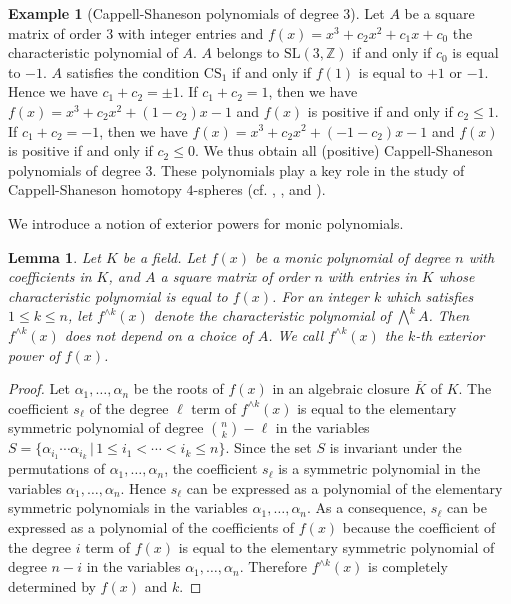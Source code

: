 \documentclass{amsart}
\theoremstyle{plain}
\newtheorem{lem}[thm]{Lemma}
\theoremstyle{definition}
\newtheorem{exmp}[thm]{Example}
\theoremstyle{remark}
\begin{document}
\begin{exmp}[Cappell-Shaneson polynomials of degree $3$]
Let $A$ be a square matrix of order $3$ with integer entries and 
$f(x)=x^3+c_2x^2+c_1x+c_0$ the characteristic polynomial of $A$. 
$A$ belongs to $\mathrm{SL}(3,\mathbb{Z})$ if and only if $c_0$ is equal to $-1$. 
$A$ satisfies the condition $\mathrm{CS}_1$ if and only if $f(1)$ is equal to $+1$ or $-1$. 
Hence we have $c_1+c_2=\pm 1$. 
If $c_1+c_2=1$, then we have $f(x)=x^3+c_2x^2+(1-c_2)x-1$ and $f(x)$ is positive if and only if 
$c_2\leq 1$. 
If $c_1+c_2=-1$, then we have $f(x)=x^3+c_2x^2+(-1-c_2)x-1$ and $f(x)$ is positive if and only if 
$c_2\leq 0$. 
We thus obtain all (positive) Cappell-Shaneson polynomials of degree $3$. 
These polynomials play a key role in the study of Cappell-Shaneson homotopy $4$-spheres 
(cf. \cite{AR1984}, \cite{Gompf2010}, \cite{KY2023} and \cite{Iwaki2024}). 
\end{exmp}

We introduce a notion of exterior powers for monic polynomials. 

\begin{lem}\label{ex}
Let $K$ be a field. 
Let $f(x)$ be a monic polynomial of degree $n$ with coefficients in $K$, 
and $A$ a square matrix of order $n$ 
with entries in $K$ whose characteristic polynomial is equal to $f(x)$. 
For an integer $k$ which satisfies $1\leq k\leq n$, 
let $f^{\wedge k}(x)$ denote the characteristic polynomial of $\bigwedge^kA$. 
Then $f^{\wedge k}(x)$ does not depend on a choice of $A$. 
We call $f^{\wedge k}(x)$ the $k$-th {\rm exterior power} of $f(x)$. 
\end{lem}

\begin{proof}
Let $\alpha_1,\ldots,\alpha_n$ be the roots of $f(x)$ in an algebraic closure $\overline{K}$ of $K$. 
The coefficient $s_{\ell}$ of the degree $\ell$ term of $f^{\wedge k}(x)$ 
is equal to the elementary symmetric polynomial of degree $\binom{n}{k}-\ell$ in the variables 
$S=\{\alpha_{i_1}\cdots\alpha_{i_k}\, |\, 1\leq i_1<\cdots <i_k\leq n\}$. 
Since the set $S$ is invariant under the permutations of 
$\alpha_1,\ldots,\alpha_n$, the coefficient $s_{\ell}$ is a symmetric polynomial 
in the variables $\alpha_1,\ldots,\alpha_n$. 
Hence $s_{\ell}$ can be expressed as a polynomial of the elementary symmetric polynomials 
in the variables $\alpha_1,\ldots,\alpha_n$. 
As a consequence, $s_{\ell}$ can be expressed as a polynomial of the coefficients of $f(x)$ 
because the coefficient of the degree $i$ term of $f(x)$ 
is equal to the elementary symmetric polynomial of degree $n-i$ in the variables 
$\alpha_1,\ldots,\alpha_n$. 
Therefore $f^{\wedge k}(x)$ is completely determined by $f(x)$ and $k$. 
\end{proof}
\end{document}

